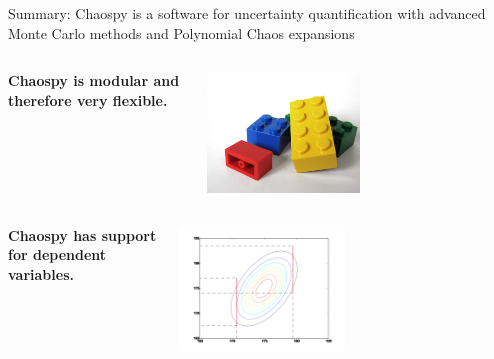 \documentclass[handout]{beamer}
\begin{document}
\begin{frame}{Summary: Chaospy is a software for uncertainty quantification with advanced Monte Carlo methods and Polynomial Chaos expansions}

\vspace{-5mm}
\begin{columns}

     \begin{center}
      \bf{Chaospy is modular and therefore very flexible.}
     \end{center}
     \begin{center}
            \includegraphics[width=0.5\textwidth]{lego.jpg}
     \end{center}

 \end{columns}

\begin{columns}
  \begin{center}
   \bf{Chaospy has support for dependent variables.}
  \end{center}
     \begin{center}
            \includegraphics[width=0.5\textwidth]{dependent.png}
     \end{center}

 \end{columns}




\end{frame}
\end{document}
